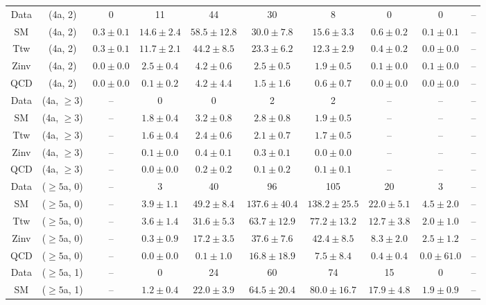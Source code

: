 \begin{table}[h!]
{\begin{tabular}{cccccccccc}
	Data & (4a, 2) & 0 & 11 & 44 & 30 & 8 & 0 & 0 & -- \\[0.5ex] 
	SM & (4a, 2) & $0.3\pm 0.1$ & $14.6\pm 2.4$ & $58.5\pm 12.8$ & $30.0\pm 7.8$ & $15.6\pm 3.3$ & $0.6\pm 0.2$ & $0.1\pm 0.1$ & -- \\[0.5ex] 
	Ttw & (4a, 2) & $0.3\pm 0.1$ & $11.7\pm 2.1$ & $44.2\pm 8.5$ & $23.3\pm 6.2$ & $12.3\pm 2.9$ & $0.4\pm 0.2$ & $0.0\pm 0.0$ & -- \\[0.5ex] 
	Zinv & (4a, 2) & $0.0\pm 0.0$ & $2.5\pm 0.4$ & $4.2\pm 0.6$ & $2.5\pm 0.5$ & $1.9\pm 0.5$ & $0.1\pm 0.0$ & $0.1\pm 0.0$ & -- \\[0.5ex] 
	QCD & (4a, 2) & $0.0\pm 0.0$ & $0.1\pm 0.2$ & $4.2\pm 4.4$ & $1.5\pm 1.6$ & $0.6\pm 0.7$ & $0.0\pm 0.0$ & $0.0\pm 0.0$ & -- \\[0.5ex] 
	Data & (4a, $\ge3$) & -- & 0 & 0 & 2 & 2 & -- & -- & -- \\[0.5ex] 
	SM & (4a, $\ge3$) & -- & $1.8\pm 0.4$ & $3.2\pm 0.8$ & $2.8\pm 0.8$ & $1.9\pm 0.5$ & -- & -- & -- \\[0.5ex] 
	Ttw & (4a, $\ge3$) & -- & $1.6\pm 0.4$ & $2.4\pm 0.6$ & $2.1\pm 0.7$ & $1.7\pm 0.5$ & -- & -- & -- \\[0.5ex] 
	Zinv & (4a, $\ge3$) & -- & $0.1\pm 0.0$ & $0.4\pm 0.1$ & $0.3\pm 0.1$ & $0.0\pm 0.0$ & -- & -- & -- \\[0.5ex] 
	QCD & (4a, $\ge3$) & -- & $0.0\pm 0.0$ & $0.2\pm 0.2$ & $0.1\pm 0.2$ & $0.1\pm 0.1$ & -- & -- & -- \\[0.5ex] 
	Data & ($\ge5$a, 0) & -- & 3 & 40 & 96 & 105 & 20 & 3 & -- \\[0.5ex] 
	SM & ($\ge5$a, 0) & -- & $3.9\pm 1.1$ & $49.2\pm 8.4$ & $137.6\pm 40.4$ & $138.2\pm 25.5$ & $22.0\pm 5.1$ & $4.5\pm 2.0$ & -- \\[0.5ex] 
	Ttw & ($\ge5$a, 0) & -- & $3.6\pm 1.4$ & $31.6\pm 5.3$ & $63.7\pm 12.9$ & $77.2\pm 13.2$ & $12.7\pm 3.8$ & $2.0\pm 1.0$ & -- \\[0.5ex] 
	Zinv & ($\ge5$a, 0) & -- & $0.3\pm 0.9$ & $17.2\pm 3.5$ & $37.6\pm 7.6$ & $42.4\pm 8.5$ & $8.3\pm 2.0$ & $2.5\pm 1.2$ & -- \\[0.5ex] 
	QCD & ($\ge5$a, 0) & -- & $0.0\pm 0.0$ & $0.1\pm 1.0$ & $16.8\pm 18.9$ & $7.5\pm 8.4$ & $0.4\pm 0.4$ & $0.0\pm 61.0$ & -- \\[0.5ex] 
	Data & ($\ge5$a, 1) & -- & 0 & 24 & 60 & 74 & 15 & 0 & -- \\[0.5ex] 
	SM & ($\ge5$a, 1) & -- & $1.2\pm 0.4$ & $22.0\pm 3.9$ & $64.5\pm 20.4$ & $80.0\pm 16.7$ & $17.9\pm 4.8$ & $1.9\pm 0.9$ & -- \\[0.5ex] 

\end{tabular}}
\end{table}
